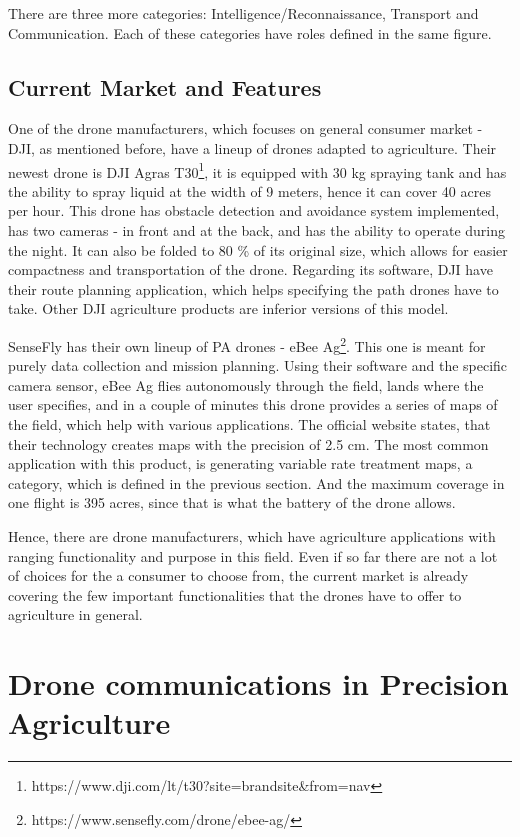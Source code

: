 \documentclass[11pt,a4paper,footinclude=true,headinclude=true, oneside]{scrbook}
\begin{document}
There are three more categories: Intelligence/Reconnaissance, Transport and Communication. Each of these categories have roles defined in the same figure.
    
\section{Current Market and Features}

One of the drone manufacturers, which focuses on general consumer market - DJI, as mentioned before, have a lineup of drones adapted to agriculture. Their newest drone is DJI Agras T30\footnote{https://www.dji.com/lt/t30?site=brandsite\&from=nav}, it is equipped with 30 kg spraying tank and has the ability to spray liquid at the width of 9 meters, hence it can cover 40 acres per hour. This drone has obstacle detection and avoidance system implemented, has two cameras - in front and at the back, and has the ability to operate during the night. It can also be folded to 80 \% of its original size, which allows for easier compactness and transportation of the drone. Regarding its software, DJI have their route planning application, which helps specifying the path drones have to take. Other DJI agriculture products are inferior versions of this model.

SenseFly has their own lineup of PA drones - eBee Ag\footnote{https://www.sensefly.com/drone/ebee-ag/}. This one is meant for purely data collection and mission planning. Using their software and the specific camera sensor, eBee Ag flies autonomously through the field, lands where the user specifies, and in a couple of minutes this drone provides a series of maps of the field, which help with various applications. The official website states, that their technology creates maps with the precision of 2.5 cm. The most common application with this product, is generating variable rate treatment maps, a category, which is defined in the previous section. And the maximum coverage in one flight is 395 acres, since that is what the battery of the drone allows.

Hence, there are drone manufacturers, which have agriculture applications with ranging functionality and purpose in this field. Even if so far there are not a lot of choices for the a consumer to choose from, the current market is already covering the few important functionalities that the drones have to offer to agriculture in general.

\chapter{Drone communications in Precision Agriculture}
\end{document}
